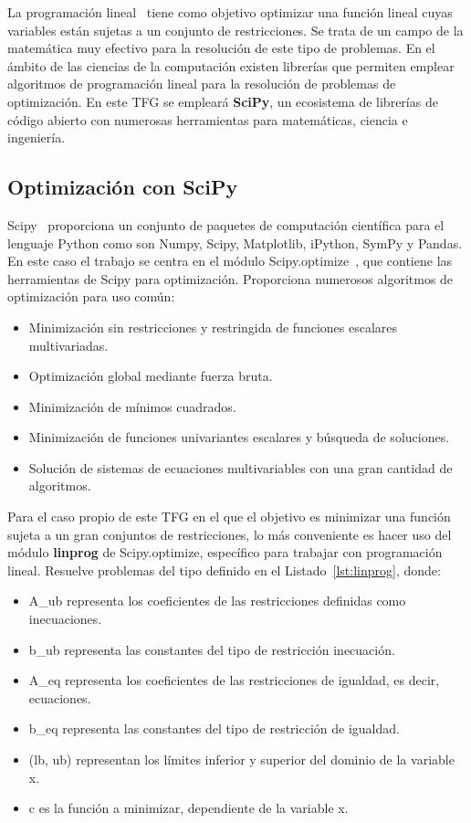 La programación lineal~\cite{Loom64} tiene como objetivo optimizar una función lineal cuyas variables están sujetas a un conjunto de restricciones.
Se trata de un campo de la matemática muy efectivo para la resolución de este tipo de problemas. En el ámbito de las ciencias de la computación existen librerías que permiten emplear algoritmos de programación lineal para la resolución de problemas de optimización. En este \gls{TFG} se empleará \textbf{SciPy}, un ecosistema de librerías de código abierto con numerosas herramientas para matemáticas, ciencia e ingeniería.

\subsection{Optimización con SciPy}
Scipy~\cite{Scip} proporciona un conjunto de paquetes de computación científica para el lenguaje Python como son Numpy, Scipy, Matplotlib, iPython, SymPy y Pandas. En este caso el trabajo se centra en el módulo Scipy.optimize~\cite{SciOp}, que contiene las herramientas de Scipy para optimización. Proporciona numerosos algoritmos de optimización para uso común:
\begin{itemize}
\item Minimización sin restricciones y restringida de funciones escalares multivariadas.
\item Optimización global mediante fuerza bruta.
\item Minimización de mínimos cuadrados.
\item Minimización de funciones univariantes escalares y búsqueda de soluciones.
\item Solución de sistemas de ecuaciones multivariables con una gran cantidad de algoritmos.
\end{itemize}
Para el caso propio de este \gls{TFG} en el que el objetivo es minimizar una función sujeta a un gran conjuntos de restricciones, lo más conveniente es hacer uso del módulo \textbf{linprog} de Scipy.optimize, específico para trabajar con programación lineal. Resuelve problemas del tipo definido en el Listado~\ref{lst:linprog}, donde:
\begin{itemize}
\item A\_ub representa los coeficientes de las restricciones definidas como inecuaciones.
\item b\_ub representa las constantes del tipo de restricción inecuación.
\item A\_eq representa los coeficientes de las restricciones de igualdad, es decir, ecuaciones.
\item b\_eq representa las constantes del tipo de restricción de igualdad.
\item (lb, ub) representan los límites inferior y superior del dominio de la variable x.
\item c es la función a minimizar, dependiente de la variable x.
\end{itemize}
